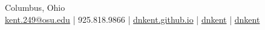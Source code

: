 \documentclass[]{deedy-resume-openfont}
\begin{document}
%
%


%
%

{   Columbus, Ohio \\
	\href{mailto:kent.249@osu.edu}{\faEnvelope \hspace{0.1em} kent.249@osu.edu} |
	\faMobilePhone \hspace{0.1em} 925.818.9866 |
	\href{http://dnkent.github.io}{\faGlobe \hspace{0.1em} dnkent.github.io}
|  \href{https://github.com/dnkent}{\faGithub \hspace{0.1em} dnkent} |
\href{https://www.linkedin.com/in/dnkent/}{\faLinkedinSquare \hspace{0.1em} dnkent}
}



\end{document}

